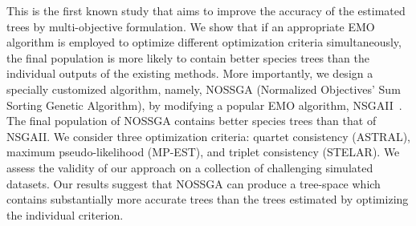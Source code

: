 This is the first known study that aims to improve the accuracy of the estimated trees by multi-objective formulation. We show that if an appropriate EMO algorithm is employed to optimize different optimization criteria simultaneously, the final population is more likely to contain better species trees than the individual outputs of the existing methods.
More importantly, we design a specially customized algorithm, namely, NOSSGA (Normalized Objectives' Sum Sorting Genetic Algorithm), by modifying a popular EMO algorithm, NSGAII~\cite{deb2002fast}. The final population of NOSSGA contains better species trees than that of NSGAII.  %
We consider three optimization criteria: quartet consistency (ASTRAL), maximum pseudo-likelihood (MP-EST), and triplet consistency (STELAR). We assess the validity of our approach on a collection of challenging simulated datasets. Our results suggest that NOSSGA can produce a tree-space which contains substantially more accurate trees than the trees estimated by optimizing the individual criterion. 






